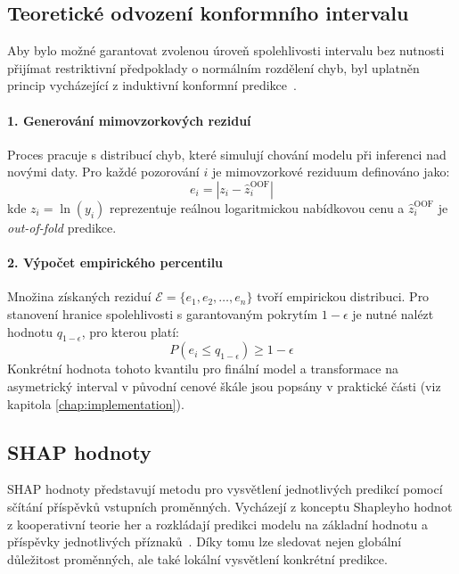 \subsection*{Teoretické odvození konformního intervalu}
\label{subsec:teoreticke_odvozeni_kvantilu}

Aby bylo možné garantovat zvolenou úroveň spolehlivosti intervalu bez nutnosti přijímat restriktivní předpoklady o normálním rozdělení chyb, byl uplatněn princip vycházející z induktivní konformní predikce~\cite{Vovk2005Algorithmic, Papadopoulos2002Inductive}.

\paragraph{1. Generování mimovzorkových reziduí}
Proces pracuje s distribucí chyb, které simulují chování modelu při inferenci nad novými daty. Pro každé pozorování $i$ je mimovzorkové reziduum definováno jako:
\[
    e_i = \left| z_i - \hat{z}_i^{\text{OOF}} \right|
\]
kde $z_i = \ln(y_i)$ reprezentuje reálnou logaritmickou nabídkovou cenu a $\hat{z}_i^{\text{OOF}}$ je \textit{out-of-fold} predikce.

\paragraph{2. Výpočet empirického percentilu}
Množina získaných reziduí $\mathcal{E} = \{e_1, e_2, \dots, e_n\}$ tvoří empirickou distribuci. Pro stanovení hranice spolehlivosti s garantovaným pokrytím $1 - \epsilon$ je nutné nalézt hodnotu $q_{1-\epsilon}$, pro kterou platí:
\[
    P(e_i \le q_{1-\epsilon}) \ge 1 - \epsilon
\]
Konkrétní hodnota tohoto kvantilu pro finální model a transformace na asymetrický interval v původní cenové škále jsou popsány v praktické části (viz kapitola \ref{chap:implementation}).

\subsection{SHAP hodnoty}
\label{subsec:shap_theory}

SHAP hodnoty představují metodu pro vysvětlení jednotlivých predikcí pomocí sčítání příspěvků vstupních proměnných. Vycházejí z konceptu Shapleyho hodnot z kooperativní teorie her a rozkládají predikci modelu na základní hodnotu a příspěvky jednotlivých příznaků~\cite{LundbergLee2017SHAP}. Díky tomu lze
sledovat nejen globální důležitost proměnných, ale také lokální vysvětlení konkrétní predikce.

